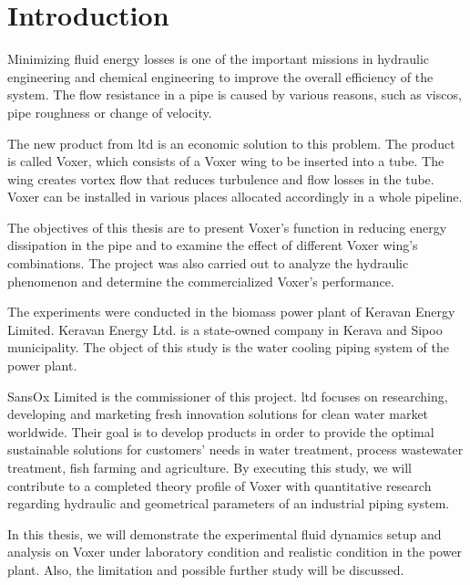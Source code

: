 
\chapter{Introduction}

Minimizing fluid energy losses is one of the important missions in hydraulic engineering and chemical engineering to improve the overall efficiency of the system. The flow resistance in a pipe is caused by various reasons, such as \gls{viscos}, pipe roughness or change of velocity.

The new product from \gls{ltd} is an economic solution to this problem. The product is called Voxer, which consists of a Voxer wing to be inserted into a tube. The wing creates vortex flow that reduces turbulence and flow losses in the tube. Voxer can be installed in various places allocated accordingly in a whole pipeline.

The objectives of this thesis are to present Voxer’s function in reducing energy dissipation in the pipe and to examine the effect of different Voxer wing’s combinations. The project was also carried out to analyze the hydraulic phenomenon and determine the commercialized Voxer’s performance.

The experiments were conducted in the biomass power plant of Keravan Energy Limited. Keravan Energy Ltd. is a state-owned company in Kerava and Sipoo municipality. The object of this study is the water cooling piping system of the power plant.

SansOx Limited is the commissioner of this project. \gls{ltd} focuses on researching, developing and marketing fresh innovation solutions for clean water market worldwide. Their goal is to develop products in order to provide the optimal sustainable solutions for customers’ needs in water treatment, process wastewater treatment, fish farming and agriculture. By executing this study, we will contribute to a completed theory profile of Voxer with quantitative research regarding hydraulic and geometrical parameters of an industrial piping system.

In this thesis, we will demonstrate the experimental fluid dynamics setup and analysis on Voxer under laboratory condition and realistic condition in the power plant. Also, the limitation and possible further study will be discussed.
\clearpage %
